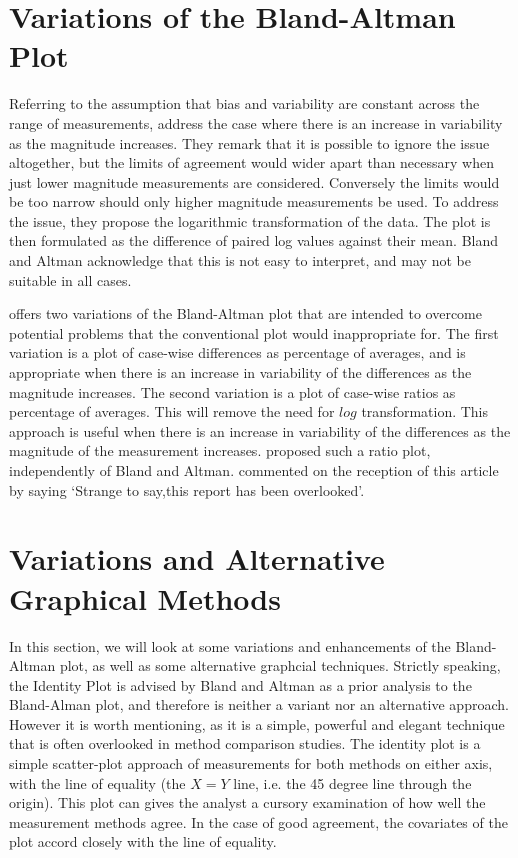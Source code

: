\documentclass[12pt, a4paper]{report}
\begin{document}
\section{Variations of the Bland-Altman Plot} Referring to the
assumption that bias and variability are constant across the range
of measurements, \citet{BA99} address the case where there is an
increase in variability as the magnitude increases. They remark
that it is possible to ignore the issue altogether, but the limits
of agreement would wider apart than necessary when just lower
magnitude measurements are considered. Conversely the limits would
be too narrow should only higher magnitude measurements be used.
To address the issue, they propose the logarithmic transformation
of the data. The plot is then formulated as the difference of
paired log values against their mean. Bland and Altman acknowledge
that this is not easy to interpret, and may not be suitable in
all cases.

\citet{BA99} offers two variations of the Bland-Altman plot that
are intended to overcome potential problems that the conventional
plot would inappropriate for. The first variation is a plot of
case-wise differences as percentage of averages, and is
appropriate when there is an increase in variability of the
differences as the magnitude increases. The second variation is a
plot of case-wise ratios as percentage of averages. This will
remove the need for $log$ transformation. This approach is useful
when there is an increase in variability of the differences as the
magnitude of the measurement increases. \citet{Eksborg} proposed
such a ratio plot, independently of Bland and Altman.
\citet{Dewitte} commented on the reception of this article by
saying `Strange to say,this report has been overlooked'.

	\section{Variations and Alternative Graphical Methods}
	In this section, we will look at some variations and enhancements of the Bland-Altman plot, as well as some alternative graphcial techniques. Strictly speaking, the Identity Plot is advised by Bland and Altman as a prior analysis to the Bland-Alman plot, and therefore is neither a variant nor an alternative approach. However it is worth mentioning, as it is a simple, powerful and elegant technique that is often overlooked in method comparison studies. The identity plot is a simple scatter-plot approach of measurements for both methods on either axis, with the line of equality (the $X=Y$ line, i.e. the 45 degree line through the origin). This plot can gives the analyst a cursory examination of how well the measurement methods agree. In the case of good agreement, the covariates of the plot accord closely with the line of equality.
	
\end{document}
